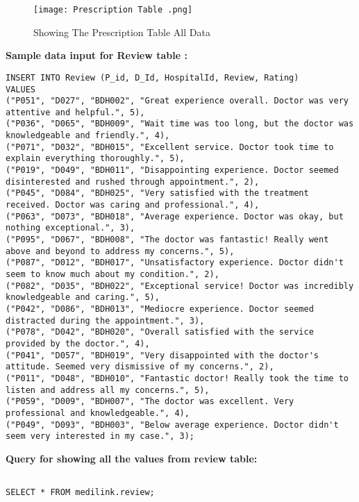 \documentclass[11pt]{article}
\begin{document}
\begin{figure}[H]
    \centering
    \texttt{[image: Prescription Table .png]}
    \caption{Showing The Prescription Table All Data}
    \label{fig:Showing the Data from prescription table}
\end{figure}
\newline
\newline

\textbf{Sample data input for Review table :}

\begin{lstlisting}
INSERT INTO Review (P_id, D_Id, HospitalId, Review, Rating)
VALUES
("P051", "D027", "BDH002", "Great experience overall. Doctor was very attentive and helpful.", 5),
("P036", "D065", "BDH009", "Wait time was too long, but the doctor was knowledgeable and friendly.", 4),
("P071", "D032", "BDH015", "Excellent service. Doctor took time to explain everything thoroughly.", 5),
("P019", "D049", "BDH011", "Disappointing experience. Doctor seemed disinterested and rushed through appointment.", 2),
("P045", "D084", "BDH025", "Very satisfied with the treatment received. Doctor was caring and professional.", 4),
("P063", "D073", "BDH018", "Average experience. Doctor was okay, but nothing exceptional.", 3),
("P095", "D067", "BDH008", "The doctor was fantastic! Really went above and beyond to address my concerns.", 5),
("P087", "D012", "BDH017", "Unsatisfactory experience. Doctor didn't seem to know much about my condition.", 2),
("P082", "D035", "BDH022", "Exceptional service! Doctor was incredibly knowledgeable and caring.", 5),
("P042", "D086", "BDH013", "Mediocre experience. Doctor seemed distracted during the appointment.", 3),
("P078", "D042", "BDH020", "Overall satisfied with the service provided by the doctor.", 4),
("P041", "D057", "BDH019", "Very disappointed with the doctor's attitude. Seemed very dismissive of my concerns.", 2),
("P011", "D048", "BDH010", "Fantastic doctor! Really took the time to listen and address all my concerns.", 5),
("P059", "D009", "BDH007", "The doctor was excellent. Very professional and knowledgeable.", 4),
("P049", "D093", "BDH003", "Below average experience. Doctor didn't seem very interested in my case.", 3);
\end{lstlisting}
\textbf{Query for showing all the values from review table:}
\begin{lstlisting}

SELECT * FROM medilink.review;
\end{lstlisting}
\end{document}
